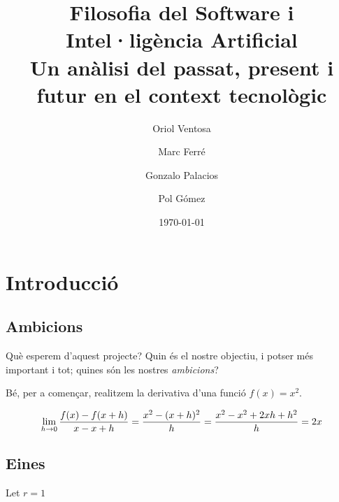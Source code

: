 \documentclass[a4paper,12pt]{report}
\begin{document}
\title{{\bf Filosofia del Software i Intel·ligència Artificial} \\ \vspace{2 mm} {\large Un anàlisi del
passat, present i futur en el context tecnològic}}

\author{
	Oriol Ventosa \and
	Marc Ferré \and
	Gonzalo Palacios \and
	Pol Gómez
}

\date{\today}
\maketitle

\tableofcontents

\chapter{Introducció}
\section{Ambicions}
Què esperem d'aquest projecte? Quin és el nostre objectiu, i potser més
important i tot; quines són les nostres \emph{ambicions}?

Bé, per a començar, realitzem la derivativa d'una funció \(f(x) = x^2\).

\[
	\lim_{h \to 0} {f(x) - f(x+h) \over x - x + h} = 
	{x^2 - (x+h)^2 \over h} =
	{x^2 - x^2 + 2xh + h^2 \over h} = 
	{2x}
\]

\section{Eines}
Let \(r = 1\)
\end{document}
